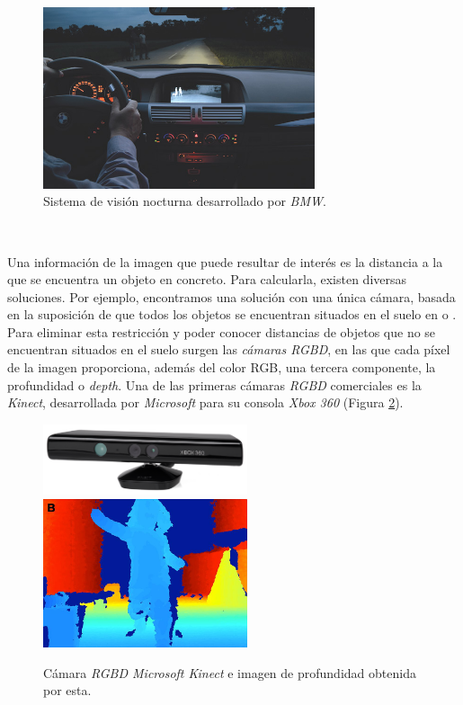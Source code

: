 \begin{figure} [h!]
	\begin{center}
		\includegraphics[width=8cm]{figs/nightvision}
	\end{center}
	\caption{Sistema de visión nocturna desarrollado por \textit{BMW}.}
	\label{fig:nightvision}
\end{figure}\

Una información de la imagen que puede resultar de interés es la distancia a la que se encuentra un objeto en concreto. Para calcularla, existen diversas soluciones. Por ejemplo, encontramos una solución con una única cámara, basada en la suposición de que todos los objetos se encuentran situados en el suelo en \cite{vega19d} o \cite{distanceopencv}. Para eliminar esta restricción y poder conocer distancias de objetos que no se encuentran situados en el suelo surgen las \textit{cámaras RGBD}, en las que cada píxel de la imagen proporciona, además del color RGB, una tercera componente, la profundidad o \textit{depth}. Una de las primeras cámaras \textit{RGBD} comerciales es la \textit{Kinect}, desarrollada por \textit{Microsoft} para su consola \textit{Xbox 360} (Figura \ref{fig:kinect}).\\

\begin{figure} [h!]
	\begin{center}
		\includegraphics[width=6cm]{figs/kinect}\hspace{0.5cm}\includegraphics[width=6cm]{figs/depth}
	\end{center}
	\caption{Cámara \textit{RGBD Microsoft Kinect} e imagen de profundidad obtenida por esta.}
	\label{fig:kinect}
\end{figure}\

